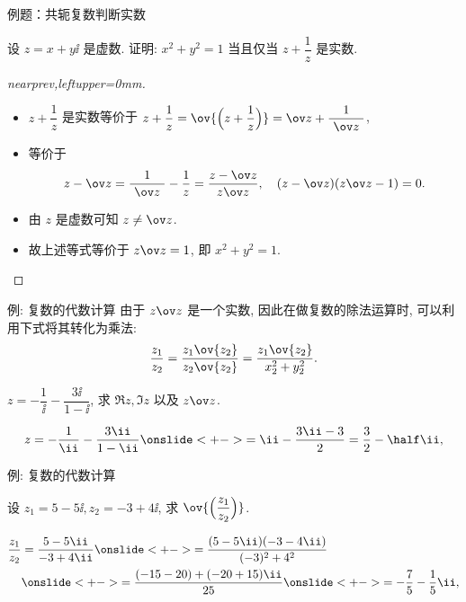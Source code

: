 \begin{frame}{例题：共轭复数判断实数}
	\onslide<+->
	\begin{example}[nearnext]
		设 $z=x+y\ii$ 是虚数.
		证明: $x^2+y^2=1$ 当且仅当 $z+\dfrac 1z$ 是实数.
	\end{example}
	\onslide<+->
	\begin{proof}[nearprev,leftupper=0mm]
		\begin{itemize}
			\item $z+\dfrac 1z$ 是实数等价于
				$z+\dfrac 1z=\ov{\Bigl(z+\dfrac 1z\Bigr)}=\ov z+\dfrac1{~\ov z~}$,
			\item 等价于
			\[
				z-\ov z=\frac1{~\ov z~}-\frac1z=\frac{z-\ov z}{z\ov z},\quad (z-\ov z)(z\ov z-1)=0.
			\]
			\item 由 $z$ 是虚数可知 $z\neq \ov z$.
			\item 故上述等式等价于 $z\ov z=1$, 即 $x^2+y^2=1$.\qedhere
		\end{itemize}
	\end{proof}
\end{frame}


\begin{frame}{例: 复数的代数计算}
	\onslide<+->
	由于 $z\ov z$ 是一个实数,
	\onslide<+->
	因此在做复数的除法运算时, 可以利用下式将其转化为乘法:
	\[
		\dfrac{z_1}{z_2}=\dfrac{z_1\ov{z_2}}{z_2\ov{z_2}}=\dfrac{z_1\ov{z_2}}{x_2^2+y_2^2}.
	\]
	\bigdel
	\onslide<+->
	\begin{example}[nearnext]
		$z=-\dfrac1\ii-\dfrac{3\ii}{1-\ii }$, 求 $\Re z,\Im z$ 以及 $z\ov z$.
	\end{example}
	\onslide<+->
	\begin{solution}[nearprev]
		\[
			z=-\frac1\ii-\frac{3\ii}{1-\ii }
			\onslide<+->{=\ii-\frac{3\ii-3}2=\frac32-\half \ii,}
		\]
		\onslide<+->{%
		\[
			\Re z=\frac32,\quad\Im z=-\half ,\quad
			z\ov z=\Bigl(\frac32\Bigr)^2+\Bigl(-\half\Bigr)^2=\frac52.
		\]
		}
		\bigdel
	\end{solution}
\end{frame}


\begin{frame}{例: 复数的代数计算}
	\onslide<+->
	\begin{example}[nearnext]
		设 $z_1=5-5\ii,z_2=-3+4\ii$, 求 $\ov{\Bigl(\dfrac{z_1}{z_2}\Bigr)}$.
	\end{example}
	\onslide<+->
	\begin{solution}[nearprev]
		\begin{align*}
			\frac{z_1}{z_2}&=\frac{5-5\ii}{-3+4\ii}
			\onslide<+->{=\frac{(5-5\ii)(-3-4\ii)}{(-3)^2+4^2}}\\
			&\onslide<+->{=\frac{(-15-20)+(-20+15)\ii}{25}}
			\onslide<+->{=-\frac75-\frac15\ii,}
		\end{align*}
		\onslide<+->{%
			因此 $\ov{\Bigl(\dfrac{z_1}{z_2}\Bigr)}=-\dfrac75+\dfrac15\ii$.
		}
	\end{solution}
\end{frame}



